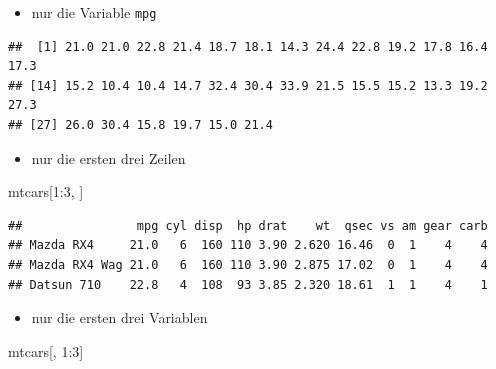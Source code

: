 \documentclass[12pt,a4paper]{article}
\newenvironment{Shaded}{\begin{snugshade}}{\end{snugshade}}
\newcommand{\DecValTok}[1]{\textcolor[rgb]{0.00,0.00,0.81}{#1}}
\newcommand{\NormalTok}[1]{#1}
\newcommand{\SpecialCharTok}[1]{\textcolor[rgb]{0.00,0.00,0.00}{#1}}
\begin{document}
\begin{itemize}
  \item nur die Variable \texttt{mpg}
\end{itemize}

\begin{Shaded}
\end{Shaded}

\begin{verbatim}
##  [1] 21.0 21.0 22.8 21.4 18.7 18.1 14.3 24.4 22.8 19.2 17.8 16.4 17.3
## [14] 15.2 10.4 10.4 14.7 32.4 30.4 33.9 21.5 15.5 15.2 13.3 19.2 27.3
## [27] 26.0 30.4 15.8 19.7 15.0 21.4
\end{verbatim}

\begin{itemize}
  \item nur die ersten drei Zeilen
\end{itemize}

\begin{Shaded}
\begin{Highlighting}[]
\NormalTok{    mtcars[}\DecValTok{1}\SpecialCharTok{:}\DecValTok{3}\NormalTok{, ]}
\end{Highlighting}
\end{Shaded}

\begin{verbatim}
##                mpg cyl disp  hp drat    wt  qsec vs am gear carb
## Mazda RX4     21.0   6  160 110 3.90 2.620 16.46  0  1    4    4
## Mazda RX4 Wag 21.0   6  160 110 3.90 2.875 17.02  0  1    4    4
## Datsun 710    22.8   4  108  93 3.85 2.320 18.61  1  1    4    1
\end{verbatim}

\begin{itemize}
  \item nur die ersten drei Variablen
\end{itemize}

\begin{Shaded}
\begin{Highlighting}[]
\NormalTok{    mtcars[, }\DecValTok{1}\SpecialCharTok{:}\DecValTok{3}\NormalTok{]}
\end{Highlighting}
\end{Shaded}
\end{document}
